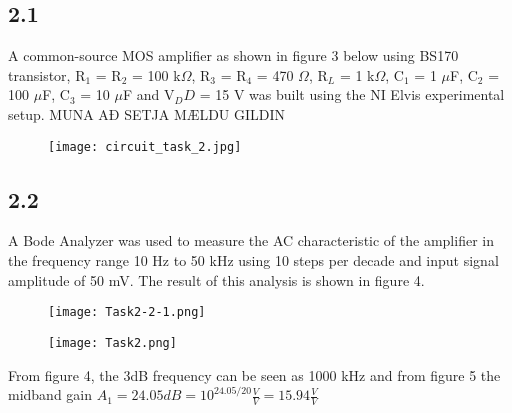 \subsection*{2.1}
A common-source MOS amplifier as shown in figure 3 below using BS170 transistor, R$_1$ = R$_2$ = 100 k$\Omega$, R$_3$ = R$_4$ = 470 $\Omega$, R$_L$ = 1 k$\Omega$, C$_1$ = 1 $\mu$F, C$_2$ = 100 $\mu$F, C$_3$ = 10 $\mu$F and V$_DD$ = 15 V was built using the NI Elvis experimental setup. MUNA AÐ SETJA MÆLDU GILDIN

    \begin{figure}[h!]
        \centering
        \texttt{[image: circuit\_task\_2.jpg]}
    \end{figure}



\subsection*{2.2}


A Bode Analyzer was used to measure the AC characteristic of the amplifier in the frequency range 10 Hz to 50 kHz using 10 steps per decade and input signal amplitude of 50 mV. The result of this analysis is shown in figure 4.

    \begin{figure}[h!]
        \centering
        \texttt{[image: Task2-2-1.png]}
    \end{figure}

    \begin{figure}[h!]
        \centering
        \texttt{[image: Task2.png]}
    \end{figure}

From figure 4, the 3dB frequency can be seen as 1000 kHz and from figure 5 the midband gain $A_1 = 24.05 dB = 10^{24.05/20} \frac{V}{V} = 15.94 \frac{V}{V}$


